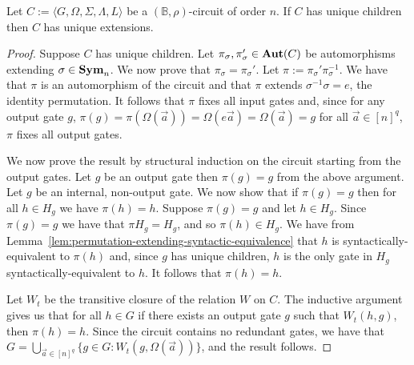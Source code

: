 \documentclass[../paper.tex]{subfiles}
\begin{document}
\begin{prop}
  Let $C := \langle G, \Omega, \Sigma, \Lambda, L\rangle$ be a $(\mathbb{B},
  \rho)$-circuit of order $n$. If $C$ has unique children then $C$ has unique
  extensions.
  \label{prop:unique-children-unique-extensions}
\end{prop}
\begin{proof}
  Suppose $C$ has unique children. Let $\pi_{\sigma}, \pi_{\sigma}' \in \text{\textbf{Aut}}(C)$
  be automorphisms extending $\sigma \in \text{\textbf{Sym}}_n$. We now prove that $\pi_\sigma
  = \pi_{\sigma}'$. Let $\pi := \pi_{\sigma}'\pi^{-1}_\sigma$. We have that
  $\pi$ is an automorphism of the circuit and that $\pi$ extends
  $\sigma^{-1}\sigma = e$, the identity permutation. It follows that $\pi$ fixes
  all input gates and, since for any output gate $g$, $\pi (g) = \pi
  (\Omega(\vec{a})) = \Omega(e \vec{a}) = \Omega(\vec{a}) = g$ for all $\vec{a}
  \in [n]^q$, $\pi$ fixes all output gates.

  We now prove the result by structural induction on the circuit starting from
  the output gates. Let $g$ be an output gate then $\pi (g) = g$ from the above
  argument. Let $g$ be an internal, non-output gate. We now show that if $\pi
  (g) = g$ then for all $h \in H_g$ we have $\pi (h) = h$. Suppose $\pi (g) = g$
  and let $h \in H_g$. Since $\pi (g) = g$ we have that $\pi H_{g} = H_g$, and
  so $\pi (h) \in H_g$. We have from
  Lemma~\ref{lem:permutation-extending-syntactic-equivalence} that $h$ is
  syntactically-equivalent to $\pi (h)$ and, since $g$ has unique children, $h$
  is the only gate in $H_g$ syntactically-equivalent to $h$. It follows that
  $\pi (h) = h$.
  
  Let $W_t$ be the transitive closure of the relation $W$ on $C$. The inductive
  argument gives us that for all $h \in G$ if there exists an output gate $g$
  such that $W_t(h, g)$, then $\pi (h) = h$. Since the circuit contains no
  redundant gates, we have that $G = \bigcup_{\vec{a} \in [n]^q} \{g \in G : W_t
  (g, \Omega(\vec{a}))\}$, and the result follows.
\end{proof}
\end{document}
